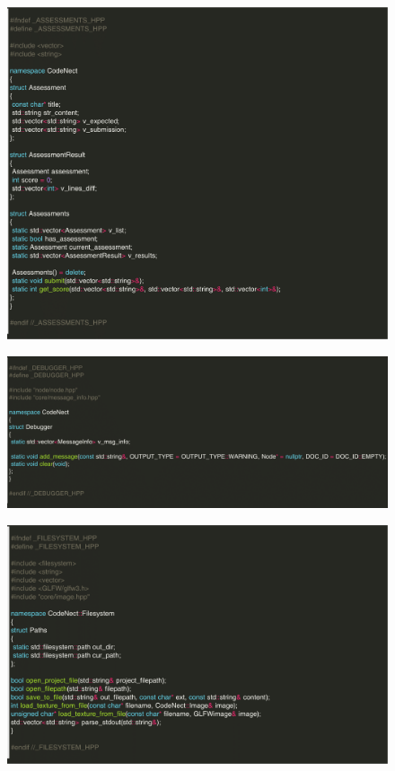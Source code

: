 \begin{figure}[H]
	 \centering
	 \includegraphics[width=\textwidth]{figures/code/assessments.png}
\end{figure}
\begin{figure}[H]
	 \centering
	 \includegraphics[width=\textwidth]{figures/code/debugger.png}
\end{figure}
\begin{figure}[H]
	 \centering
	 \includegraphics[width=\textwidth]{figures/code/filesystem.png}
\end{figure}
